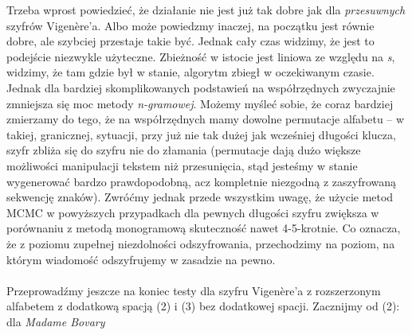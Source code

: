 \documentclass[a4paper]{article}
\theoremstyle{defn}
\theoremstyle{theorem}
\theoremstyle{lemma}
\theoremstyle{cor}
\theoremstyle{fact}
\begin{document}
Trzeba wprost powiedzieć, że działanie nie jest już tak dobre jak dla \textit{przesuwnych} szyfrów Vigenère'a. Albo może powiedzmy inaczej, na początku jest równie dobre, ale szybciej przestaje takie być. Jednak cały czas widzimy, że jest to podejście niezwykle użyteczne. Zbieżność w istocie jest liniowa ze względu na \textit{s}, widzimy, że tam gdzie był w stanie, algorytm zbiegł w oczekiwanym czasie. Jednak dla bardziej skomplikowanych podstawień na współrzędnych zwyczajnie zmniejsza się moc metody \textit{n-gramowej}. Możemy myśleć sobie, że coraz bardziej zmierzamy do tego, że na współrzędnych mamy dowolne permutacje alfabetu – w takiej, granicznej, sytuacji, przy już nie tak dużej jak wcześniej długości klucza, szyfr zbliża się do szyfru nie do złamania (permutacje dają dużo większe możliwości manipulacji tekstem niż przesunięcia, stąd jesteśmy w stanie wygenerować bardzo prawdopodobną, acz kompletnie niezgodną z zaszyfrowaną sekwencję znaków). Zwróćmy jednak przede wszystkim uwagę, że użycie metod MCMC w powyższych przypadkach dla pewnych długości szyfru zwiększa w porównaniu z metodą monogramową skuteczność nawet 4-5-krotnie. Co oznacza, że z poziomu zupełnej niezdolności odszyfrowania, przechodzimy na poziom, na którym wiadomość odszyfrujemy w zasadzie na pewno.\\\\
Przeprowadźmy jeszcze na koniec testy dla szyfru Vigenère'a z rozszerzonym alfabetem z dodatkową spacją (2) i (3) bez dodatkowej spacji. Zacznijmy od (2): dla \textit{Madame Bovary}
\end{document}
